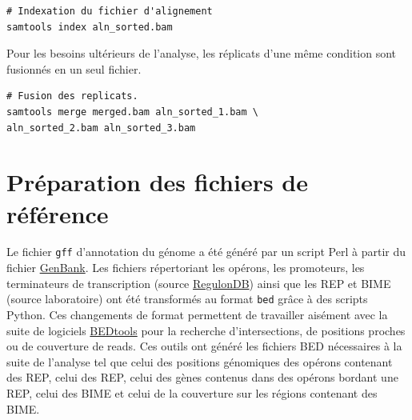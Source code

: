 \documentclass[12pt,a4paper]{report}
\begin{document}
\begin{onehalfspace}
\begin{lstlisting}[frame=single]
# Indexation du fichier d'alignement
samtools index aln_sorted.bam
\end{lstlisting}

Pour les besoins ultérieurs de l'analyse, les réplicats d'une même condition sont fusionnés en un seul fichier.
\begin{lstlisting}[frame=single]
# Fusion des replicats.
samtools merge merged.bam aln_sorted_1.bam \
aln_sorted_2.bam aln_sorted_3.bam
\end{lstlisting}

\section*{Préparation des fichiers de référence}
Le fichier \texttt{\gls{gff}} d'annotation du génome a été généré par un script Perl à partir du fichier \href{http://www.ncbi.nlm.nih.gov/nuccore/NC_000913.2}{GenBank}. Les fichiers répertoriant les opérons, les promoteurs, les terminateurs de transcription (source \href{http://regulondb.ccg.unam.mx/}{RegulonDB}) ainsi que les REP et BIME (source laboratoire) ont été transformés au format \texttt{\gls{bed}} grâce à des scripts Python.
Ces changements de format permettent de travailler aisément avec la suite de logiciels \href{http://bedtools.readthedocs.org/en/latest/}{BEDtools} pour la recherche d'intersections, de positions proches ou de couverture de reads. Ces outils ont généré les fichiers BED nécessaires à la suite de l'analyse tel que celui des positions génomiques des opérons contenant des REP, celui des REP, celui des gènes contenus dans des opérons bordant une REP, celui des BIME et celui de la couverture sur les régions contenant des BIME.


\end{onehalfspace}
\end{document}
